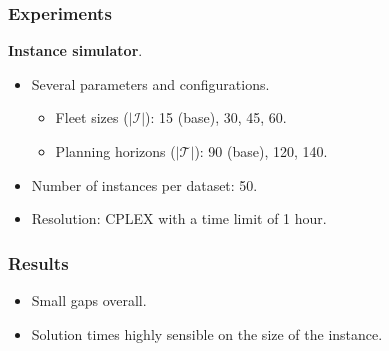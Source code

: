 \begin{frame}
\frametitle{\textbf{Experiments}}

  \textbf{Instance simulator}.
  \pause
  \begin{itemize}
    \item Several parameters and configurations.
    \begin{itemize}
      \item Fleet sizes ($|\mathcal{I}|$): 15 (base), 30, 45, 60.
      \item Planning horizons ($|\mathcal{T}|$): 90 (base), 120, 140.
    \end{itemize}
    \item Number of instances per dataset: 50.  
    \item Resolution: CPLEX with a time limit of 1 hour.
  \end{itemize}
\end{frame}

\begin{frame}
\frametitle{\textbf{Results}}

  \begin{itemize}[<+->]
    \item Small gaps overall.
    \item Solution times highly sensible on the size of the instance.
  \end{itemize}
  
\end{frame}

